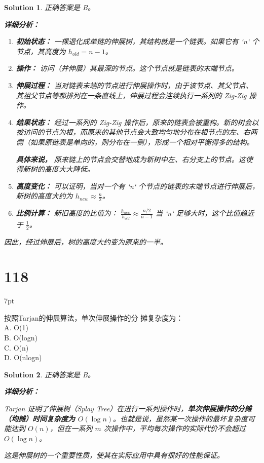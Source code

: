 \documentclass[UTF8]{report}
\newtheorem{solution}{Solution}
\theoremstyle{MyLineTheoremStyle} %
\theoremstyle{MyBlockTheoremStyle} %
\theoremstyle{MySubsubsectionStyle} %
\newenvironment{graybox}{%
        \def\FrameCommand{%
        \hspace{1pt}%
        {\color{gray}\small \vrule width 2pt}%
        {\color{graybox_color}\vrule width 4pt}%
        \colorbox{graybox_color}%
        }%
        \MakeFramed{\advance\hsize-\width\FrameRestore}%
        \noindent\hspace{-4.55pt}%
        \begin{adjustwidth}{}{7pt}%
        \vspace{2pt}\vspace{2pt}%
        }
        {%
        \vspace{2pt}\end{adjustwidth}\endMakeFramed%
        }
\begin{document}
\begin{solution}
正确答案是 B。

\textbf{详细分析：}

\begin{enumerate}
    \item \textbf{初始状态：}
    一棵退化成单链的伸展树，其结构就是一个链表。如果它有 `n` 个节点，其高度为 $h_{old} = n-1$。

    \item \textbf{操作：}
    访问（并伸展）其最深的节点。这个节点就是链表的末端节点。

    \item \textbf{伸展过程：}
    当对链表末端的节点进行伸展操作时，由于该节点、其父节点、其祖父节点等都排列在一条直线上，伸展过程会连续执行一系列的 Zig-Zig 操作。

    \item \textbf{结果状态：}
    经过一系列的 Zig-Zig 操作后，原来的链表会被重构。新的树会以被访问的节点为根，而原来的其他节点会大致均匀地分布在根节点的左、右两侧（如果原链表是单向的，则分布在一侧），形成一个相对平衡得多的结构。

    \textbf{具体来说，} 原来链上的节点会交替地成为新树中左、右分支上的节点。这使得新树的高度大大降低。

    \item \textbf{高度变化：}
    可以证明，当对一个有 `n` 个节点的链表的末端节点进行伸展后，新树的高度大约为 $h_{new} \approx \frac{n}{2}$。

    \item \textbf{比例计算：}
    新旧高度的比值为：
    $\frac{h_{new}}{h_{old}} \approx \frac{n/2}{n-1}$
    当 `n` 足够大时，这个比值趋近于 $\frac{1}{2}$。
\end{enumerate}

因此，经过伸展后，树的高度大约变为原来的一半。
\end{solution}

\section*{118}
\begin{graybox}
按照Tarjan的伸展算法，单次伸展操作的分
摊复杂度为：\\
A. O(1)\\
B. O(logn)\\
C. O(n)\\
D. O(nlogn)
\end{graybox}

\begin{solution}
正确答案是 B。

\textbf{详细分析：}

Tarjan 证明了伸展树（Splay Tree）在进行一系列操作时，\textbf{单次伸展操作的分摊（均摊）时间复杂度为 $O(\log n)$}。也就是说，虽然某一次操作的最坏复杂度可能达到 $O(n)$，但在一系列 $m$ 次操作中，平均每次操作的实际代价不会超过 $O(\log n)$。

这是伸展树的一个重要性质，使其在实际应用中具有很好的性能保证。

\end{solution}
\end{document}
